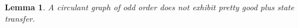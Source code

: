 \documentclass[12pt,a4paper]{article}
\newtheorem{thm}{Theorem}
\newtheorem{lem}{Lemma}
\def \e {{\bf e}}
\def \e {{\mathbf e}}
\newcommand{\ob}[1]{\left(#1\right)}
\begin{document}
\begin{lem}\label{5l8}
    A circulant graph of odd order does not exhibit pretty good plus state transfer.
\end{lem}






\end{document}
